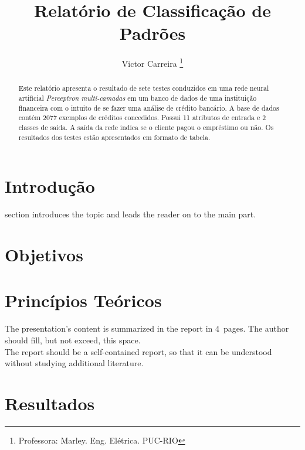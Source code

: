 \documentclass[journal, a4paper]{IEEEtran}
\begin{document}
	\title{Relatório de Classificação de Padrões}
	\author{Victor Carreira
	\thanks{Professora: Marley. Eng. Elétrica. PUC-RIO}}
	\maketitle

\begin{abstract}
	Este relatório apresenta o resultado de sete testes conduzidos em uma rede neural artificial \textit{Perceptron multi-camadas} em um banco de dados de uma instituição financeira com o intuito de se fazer uma análise de crédito bancário.  A base de dados contém 2077 exemplos de créditos concedidos. Possui 11 atributos de entrada e 2 classes de saída. A saída da rede indica se o cliente pagou o empréstimo ou não. Os resultados dos testes estão apresentados em formato de tabela.
\end{abstract}

\section{Introdução}
	 section introduces the topic and leads the reader on to the main part.

\section{Objetivos}
\section{Princípios Teóricos}
	The presentation's content is summarized in the report in 4~pages.
	The author should fill, but not exceed, this space. \\
	The report should be a self-contained report, so that it can be understood without studying additional literature.

\section{Resultados}
\end{document}

